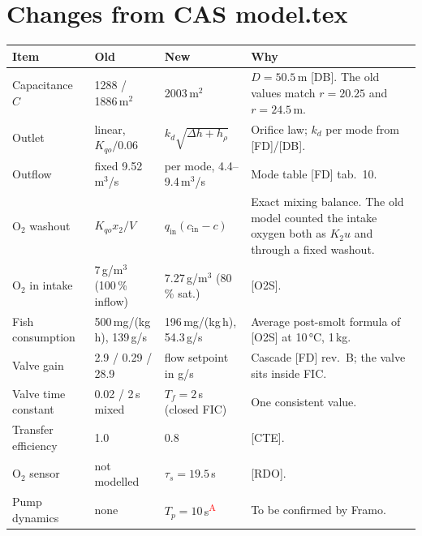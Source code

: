 \documentclass[11pt]{article}
\newcommand{\assumed}{\textsuperscript{\textcolor{red}{A}}}
\begin{document}
\section{Changes from CAS model.tex}\label{tab:changes}
\begin{tabularx}{\textwidth}{@{}l l l L@{}}
\toprule
Item & Old & New & Why \\
\midrule
Capacitance $C$ & 1288 / 1886\,m$^2$ & 2003\,m$^2$ & $D = 50.5$\,m [DB]. The old values match $r=20.25$ and $r=24.5$\,m. \\
Outlet & linear, $K_{qo}/0.06$ & $k_d\sqrt{\Delta h+h_\rho}$ & Orifice law; $k_d$ per mode from [FD]/[DB]. \\
Outflow & fixed 9.52\,m$^3$/s & per mode, 4.4--9.4\,m$^3$/s & Mode table [FD] tab.~10. \\
O$_2$ washout & $K_{qo}x_2/V$ & $q_\text{in}(c_\text{in}-c)$ & Exact mixing balance. The old model counted the intake oxygen both as $K_2u$ and through a fixed washout. \\
O$_2$ in intake & 7\,g/m$^3$ (100\,\% inflow) & 7.27\,g/m$^3$ (80\,\% sat.) & [O2S]. \\
Fish consumption & 500\,mg/(kg\,h), 139\,g/s & 196\,mg/(kg\,h), 54.3\,g/s & Average post-smolt formula of [O2S] at 10\,°C, 1\,kg. \\
Valve gain & 2.9 / 0.29 / 28.9 & flow setpoint in g/s & Cascade [FD] rev.~B; the valve sits inside FIC. \\
Valve time constant & 0.02 / 2\,s mixed & $T_f = 2$\,s (closed FIC) & One consistent value. \\
Transfer efficiency & 1.0 & 0.8 & [CTE]. \\
O$_2$ sensor & not modelled & $\tau_s=19.5$\,s & [RDO]. \\
Pump dynamics & none & $T_p = 10$\,s\assumed{} & To be confirmed by Framo. \\
\bottomrule
\end{tabularx}
\end{document}
